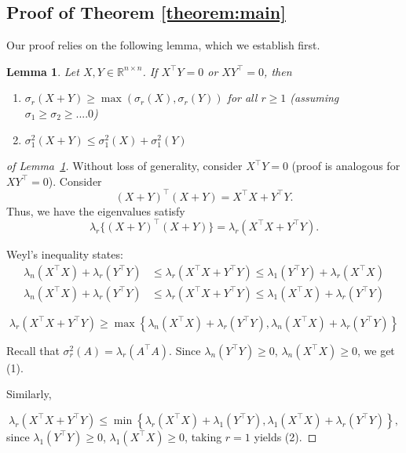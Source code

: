 \documentclass{amsart}
\def\R{\mathbb{R}} %
\newtheorem{lemma}[theorem]{Lemma}
\begin{document}
\subsection{Proof of Theorem \ref{theorem:main}}
\label{sec:proofs}
Our proof relies on the following lemma, which we establish first.
\begin{lemma}\label{lemma:singularbounds} Let $X, Y\in \R^{n \times n}$. If $X^{\top}Y = 0$ or $XY^{\top} = 0$, then
\begin{enumerate}
\item $\sigma_r(X+Y)\geq \max(\sigma_r(X), \sigma_r(Y))$ for all $r\geq 1$ (assuming $\sigma_1 \geq \sigma_2\geq ....0$)
\item $\sigma_1^2(X+Y) \leq \sigma_1^2(X) + \sigma_1^2(Y)$
\end{enumerate}
\end{lemma}
\begin{proof}[of Lemma~\ref{lemma:singularbounds}]
Without loss of generality, consider $X^{\top}Y = 0$ (proof is analogous for $XY^{\top} = 0$). Consider
$$
(X+Y)^{\top}(X+Y) = X^{\top}X + Y^{\top}Y.
$$
Thus, we have the eigenvalues satisfy
$$
\lambda_r\{(X+Y)^{\top}(X+Y) \} = \lambda_r(X^{\top}X + Y^{\top}Y).
$$

Weyl's inequality states:
\begin{align*}
    \lambda_n(X^{\top}X) +  \lambda_r(Y^{\top}Y) & \leq \lambda_r(X^{\top}X + Y^{\top}Y) \leq \lambda_1(Y^{\top}Y) +  \lambda_r(X^{\top}X) \\
    \lambda_n(X^{\top}X) +  \lambda_r(Y^{\top}Y) & \leq \lambda_r(X^{\top}X + Y^{\top}Y) \leq \lambda_1(X^{\top}X) +  \lambda_r(Y^{\top}Y) 
\end{align*}
{
$$
\lambda_r(X^{\top}X + Y^{\top}Y) \geq \max\left\{ \lambda_n(X^{\top}X) +  \lambda_r(Y^{\top}Y),  \lambda_n(X^{\top}X) +  \lambda_r(Y^{\top}Y)\right\}
$$

Recall that $\sigma^2_r(A) = \lambda_r(A^{\top}A)$. Since $\lambda_n(Y^{\top}Y) \geq 0$, $\lambda_n(X^{\top}X)\geq 0$, we get (1).

 Similarly,}
$$
\lambda_r(X^{\top}X + Y^{\top}Y) \leq \min\left\{\lambda_r(X^{\top}X) + \lambda_1(Y^{\top}Y), \lambda_1(X^{\top}X) + \lambda_r(Y^{\top}Y)\right\},
$$
 since $\lambda_1(Y^{\top}Y) \geq 0$, $\lambda_1(X^{\top}X)\geq 0$, taking $r=1$ yields (2).
\end{proof}
\end{document}
